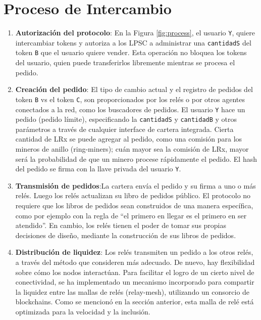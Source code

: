 \documentclass[UTF8,nofonts]{article}
\begin{document}
\begin{multicols}{2}
\begin{itemize}
\end{itemize}


\section{Proceso de Intercambio\label{sec:process}}
\begin{enumerate} 

\item \textbf{Autorizaci\'on del protocolo}: En la Figura \ref{fig:process}, el usuario \verb|Y|, quiere intercambiar tokens y autoriza a los LPSC a administrar una \verb|cantidadS| del token \verb|B| que el usuario quiere vender. Esta operaci\'on no bloquea los tokens del usuario, quien puede transferirlos libremente mientras se procesa el pedido.

\item \textbf{Creaci\'on del pedido}: El tipo de cambio actual y el registro de pedidos del token \verb|B| vs el token \verb|C|, son proporcionados por los rel\'es o por otros agentes conectados a la red, como los buscadores de pedidos. El usuario \verb|Y| hace un pedido (pedido l\'imite), especificando la \verb|cantidadS| y \verb|cantidadB| y otros par\'ametros a trav\'es de cualquier interface de cartera integrada. Cierta cantidad de LRx se puede agregar al pedido, como una comisi\'on para los mineros de anillo (ring-miners); cu\'an mayor sea la comisi\'on de LRx, mayor ser\'a la probabilidad de que un minero procese r\'apidamente el pedido. El hash del pedido se firma con la llave privada del usuario \verb|Y|.

\item \textbf{Transmisi\'on de pedidos}:La cartera env\'ia el pedido y su firma a uno o m\'as rel\'es. Luego los rel\'es actualizan su libro de pedidos p\'ublico. El protocolo no requiere que los libros de pedidos sean construidos de una manera espec\'ifica, como por ejemplo con la regla de \enquote{el primero en llegar es el primero en ser atendido}. En cambio, los rel\'es tienen el poder de tomar sus propias decisiones de dise\~no, mediante la construcci\'on de sus libros de pedidos.

\item \textbf{Distribuci\'on de liquidez}: Los rel\'es transmiten un pedido a los otros rel\'es, a trav\'es del m\'etodo que consideren m\'as adecuado. De nuevo, hay flexibilidad sobre c\'omo los nodos interact\'uan. Para facilitar el logro de un cierto nivel de conectividad, se ha implementado un mecanismo incorporado para compartir la liquidez entre las mallas de rel\'es (relay-mesh), utilizando un consorcio de blockchains. Como se mencion\'o en la secci\'on anterior, esta malla de rel\'e est\'a optimizada para la velocidad y la inclusi\'on.


\end{enumerate}
\end{multicols}
\end{document}
